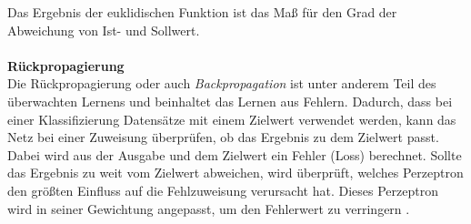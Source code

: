 Das Ergebnis der euklidischen Funktion ist das Maß für den Grad der Abweichung von Ist- und Sollwert.\\\\
\textbf{Rückpropagierung}\\
Die Rückpropagierung oder auch \textit{Backpropagation} \cite{ertel2013grundkurs} ist unter anderem Teil des überwachten Lernens und beinhaltet das Lernen aus Fehlern. Dadurch, dass bei einer Klassifizierung Datensätze mit einem Zielwert verwendet werden, kann das Netz bei einer Zuweisung überprüfen, ob das Ergebnis zu dem Zielwert passt. Dabei wird aus der Ausgabe und dem Zielwert ein Fehler (Loss) berechnet. Sollte das Ergebnis zu weit vom Zielwert abweichen, wird überprüft, welches Perzeptron den größten Einfluss auf die Fehlzuweisung verursacht hat. Dieses Perzeptron wird in seiner Gewichtung angepasst, um den Fehlerwert zu verringern \cite{goodfellow2016deep}.  
